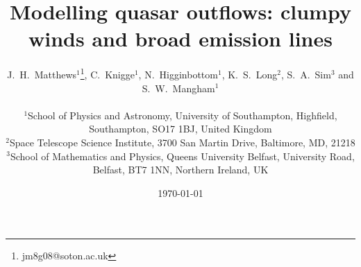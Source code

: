 \documentclass[preprint, a4paper, 11pt]{aastex}
\begin{document}


\def\py{\textsc{Python}}
\def\tar{\textsc{Tardis}}
\def\cld{\textsc{Cloudy}}
\def\agn{\textsc{Agnspec}}


\def\civ{C~\textsc{iv}}
\def\nv{N~\textsc{v}}
\def\hei{He~\textsc{i}}
\def\heii{He~\textsc{ii}}
\def\mg{Mg~\textsc{ii}}
\def\al{Al~\textsc{iii}}
\def\heii{He~\textsc{ii}}
\def\ovi{O~\textsc{vi}}
\def\la{Ly~$\alpha$}
\def\ha{H~$\alpha$}
\def\hb{H~$\beta$}



\def\araa{ARAA}
\def\nat{Nature}
\def\apjl{ApJ Letters}
\def\aapr{AAPR}
\def\ssr{SSR}
\def\apj{ApJ}
\def\apjs{ApJs}
\def\pasp{PASP}
\def\aap{A\&A}
\def\mnras{MNRAS}
\def\aj{AJ}
\def\rmxaa{RMXAA}
\def\aaps{A\&As}

%
%

\title
{
Modelling quasar outflows:
clumpy winds and broad emission lines
}



\author{
\parbox[t]{\textwidth}{
J.~H.~Matthews$^1$\thanks{jm8g08@soton.ac.uk}, C.~Knigge$^1$,
N.~Higginbottom$^1$, K.~S.~Long$^2$, S.~A.~Sim$^3$ and S.~W.~Mangham$^1$
}
\medskip  
\\$^1$School of Physics and Astronomy, University of Southampton, Highfield, Southampton, SO17 1BJ, United Kingdom
\\$^2$Space Telescope Science Institute, 3700 San Martin Drive, Baltimore, MD, 21218
\\$^3$School of Mathematics and Physics, Queens University Belfast, University Road, Belfast, BT7 1NN, Northern Ireland, UK
}

\date{\today}


%
%
\end{document}
